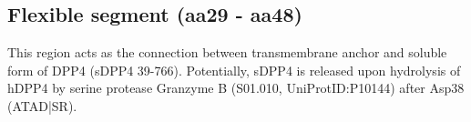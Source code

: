 \subsection{Flexible segment (aa29 - aa48)}

This region acts as the connection between transmembrane anchor and soluble form of DPP4 (sDPP4 39-766). Potentially, sDPP4 is released upon hydrolysis of hDPP4 by serine protease Granzyme B (S01.010, UniProtID:P10144) after Asp38 (ATAD|SR).~\cite{Song_2018}
